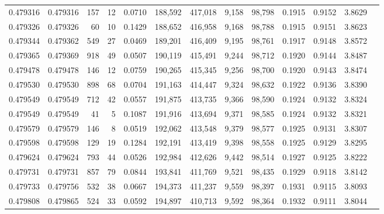 \begin{tabular}{rrrrrrrrrrrrr}
0.479316 & 0.479316 &   157 &    12 &                                     0.0710 & 188,592 & 417,018 &   9,158 &  98,798 & 0.1915 & 0.9152 & 3.8629 \\
0.479326 & 0.479326 &    60 &    10 &                                     0.1429 & 188,652 & 416,958 &   9,168 &  98,788 & 0.1915 & 0.9151 & 3.8623 \\
0.479344 & 0.479362 &   549 &    27 &                                     0.0469 & 189,201 & 416,409 &   9,195 &  98,761 & 0.1917 & 0.9148 & 3.8572 \\
0.479365 & 0.479369 &   918 &    49 &                                     0.0507 & 190,119 & 415,491 &   9,244 &  98,712 & 0.1920 & 0.9144 & 3.8487 \\
0.479478 & 0.479478 &   146 &    12 &                                     0.0759 & 190,265 & 415,345 &   9,256 &  98,700 & 0.1920 & 0.9143 & 3.8474 \\
0.479530 & 0.479530 &   898 &    68 &                                     0.0704 & 191,163 & 414,447 &   9,324 &  98,632 & 0.1922 & 0.9136 & 3.8390 \\
0.479549 & 0.479549 &   712 &    42 &                                     0.0557 & 191,875 & 413,735 &   9,366 &  98,590 & 0.1924 & 0.9132 & 3.8324 \\
0.479549 & 0.479549 &    41 &     5 &                                     0.1087 & 191,916 & 413,694 &   9,371 &  98,585 & 0.1924 & 0.9132 & 3.8321 \\
0.479579 & 0.479579 &   146 &     8 &                                     0.0519 & 192,062 & 413,548 &   9,379 &  98,577 & 0.1925 & 0.9131 & 3.8307 \\
0.479598 & 0.479598 &   129 &    19 &                                     0.1284 & 192,191 & 413,419 &   9,398 &  98,558 & 0.1925 & 0.9129 & 3.8295 \\
0.479624 & 0.479624 &   793 &    44 &                                     0.0526 & 192,984 & 412,626 &   9,442 &  98,514 & 0.1927 & 0.9125 & 3.8222 \\
0.479731 & 0.479731 &   857 &    79 &                                     0.0844 & 193,841 & 411,769 &   9,521 &  98,435 & 0.1929 & 0.9118 & 3.8142 \\
0.479733 & 0.479756 &   532 &    38 &                                     0.0667 & 194,373 & 411,237 &   9,559 &  98,397 & 0.1931 & 0.9115 & 3.8093 \\
0.479808 & 0.479865 &   524 &    33 &                                     0.0592 & 194,897 & 410,713 &   9,592 &  98,364 & 0.1932 & 0.9111 & 3.8044 \\

\end{tabular}
